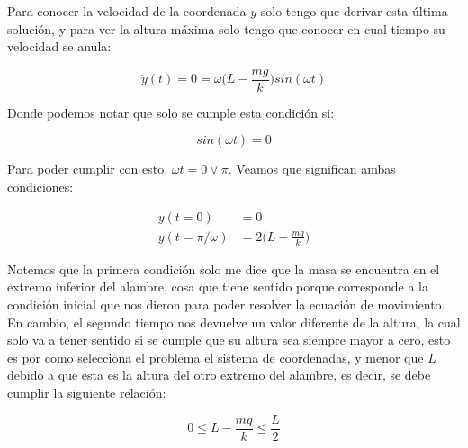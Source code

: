 \documentclass{article}
\begin{document}
\begin{multicols}{2}
Para conocer la velocidad de la coordenada $y$ solo tengo que derivar esta última solución, y para ver la altura máxima solo tengo que conocer en cual tiempo su velocidad se anula:

\begin{equation}
    \dot{y}(t) = 0 = \omega \bigg(L - \frac{mg}{k}\bigg)sin(\omega t)
\end{equation}

Donde podemos notar que solo se cumple esta condición si:

\begin{equation}
    sin(\omega t) = 0
\end{equation}

Para poder cumplir con esto, $\omega t = 0 \vee \pi$. Veamos que significan ambas condiciones:

\begin{equation}
    \begin{split}
        y(t = 0) &= 0 \\
        y(t = \pi/\omega) &= 2 \bigg( L - \frac{mg}{k} \bigg)
    \end{split}
\end{equation}

Notemos que la primera condición solo me dice que la masa se encuentra en el extremo inferior del alambre, cosa que tiene sentido porque corresponde a la condición inicial que nos dieron para poder resolver la ecuación de movimiento. En cambio, el segundo tiempo nos devuelve un valor diferente de la altura, la cual solo va a tener sentido si se cumple que su altura sea siempre mayor a cero, esto es por como selecciona el problema el sistema de coordenadas, y menor que $L$ debido a que esta es la altura del otro extremo del alambre, es decir, se debe cumplir la siguiente relación:

\begin{equation}
    0 \leq L - \frac{mg}{k} \leq \frac{L}{2}
\end{equation}

\end{multicols}
\end{document}
